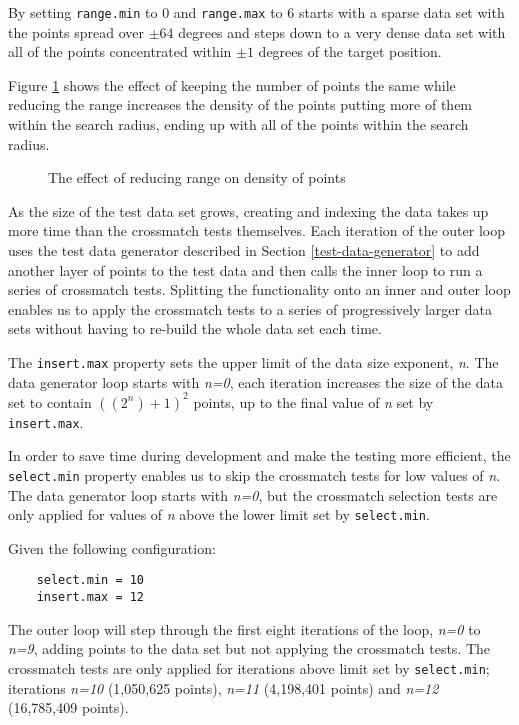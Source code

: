 \documentclass{article}
\newcommand{\crossmatch} {crossmatch\xspace}
\begin{document}
By setting \texttt{range.min} to 0 and \texttt{range.max} to 6 starts with a sparse data set with the points spread over $\pm64$ degrees and steps down to a very dense data set with all of the points concentrated within $\pm1$ degrees of the target position.

Figure \ref{fig:data-range-01} shows the effect of keeping the number of points the same while reducing the range increases the density of the points putting more of them within the search radius, ending up with all of the points within the search radius.

\begin{figure}[h]

\caption{The effect of reducing range on density of points}
\label{fig:data-range-01}
\end{figure}


As the size of the test data set grows, creating and indexing the data takes up more time than the \crossmatch tests themselves.
Each iteration of the outer loop uses the test data generator described in Section \ref{test-data-generator} to add another layer of points to the test data and then calls the inner loop to run a series of \crossmatch tests.
Splitting the functionality onto an inner and outer loop enables us to apply the \crossmatch tests to a series of progressively larger data sets without having to re-build the whole data set each time. 


The \texttt{insert.max} property sets the upper limit of the data size exponent, \textit{n}. The data generator loop starts with \textit{n=0}, each iteration increases the size of the data set to contain \(((2^n)+1)^2\) points, up to the final value of \textit{n} set by \texttt{insert.max}.

In order to save time during development and make the testing more efficient, the \texttt{select.min} property enables us to skip the \crossmatch tests for low values of \textit{n}. The data generator loop starts with \textit{n=0}, but the \crossmatch selection tests are only applied for values of \textit{n} above the lower limit set by \texttt{select.min}.

\noindent Given the following configuration:

\begin{lstlisting}
    select.min = 10
    insert.max = 12
\end{lstlisting}

The outer loop will step through the first eight iterations of the loop, \textit{n=0} to \textit{n=9}, adding points to the data set but not applying the \crossmatch tests. The \crossmatch tests are only applied for iterations above limit set by \texttt{select.min}; iterations \textit{n=10} (1,050,625 points), \textit{n=11} (4,198,401 points) and \textit{n=12} (16,785,409 points).
\end{document}
